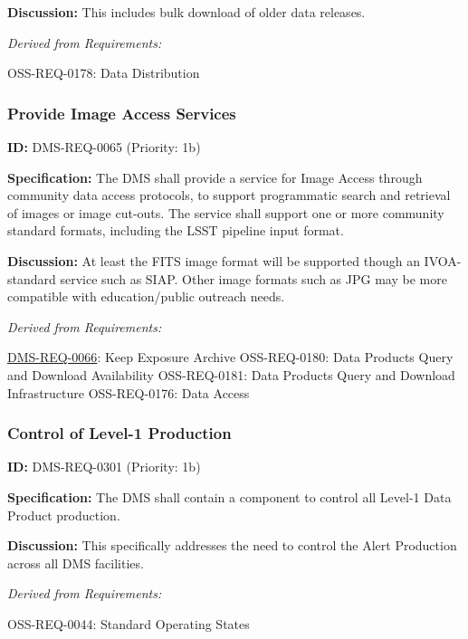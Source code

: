 \documentclass[SE,toc,lsstdraft]{lsstdoc}
\begin{document}
\textbf{Discussion:} This includes bulk download of older data releases.

\emph{Derived from Requirements:}

OSS-REQ-0178:
Data Distribution \newline

\subsubsection{Provide Image Access Services}

\label{DMS-REQ-0065}
\textbf{ID:} DMS-REQ-0065 (Priority: 1b)

\textbf{Specification:} The DMS shall provide a service for Image Access through community data access protocols, to support programmatic search and retrieval of images or image cut-outs. The service shall support one or more community standard formats, including the LSST pipeline input format.

\textbf{Discussion:} At least the FITS image format will be supported though an IVOA-standard service such as SIAP. Other image formats such as JPG may be more compatible with education/public outreach needs.

\emph{Derived from Requirements:}

\hyperref[DMS-REQ-0066]{DMS-REQ-0066}:
Keep Exposure Archive \newline
OSS-REQ-0180:
Data Products Query and Download Availability \newline
OSS-REQ-0181:
Data Products Query and Download Infrastructure \newline
OSS-REQ-0176:
Data Access \newline

\subsubsection{Control of Level-1 Production}

\label{DMS-REQ-0301}
\textbf{ID:} DMS-REQ-0301 (Priority: 1b)

\textbf{Specification:} The DMS shall contain a component to control all Level-1 Data Product production.

\textbf{Discussion: }This specifically addresses the need to control the Alert Production across all DMS facilities.

\emph{Derived from Requirements:}

OSS-REQ-0044:
Standard Operating States \newline
\end{document}
